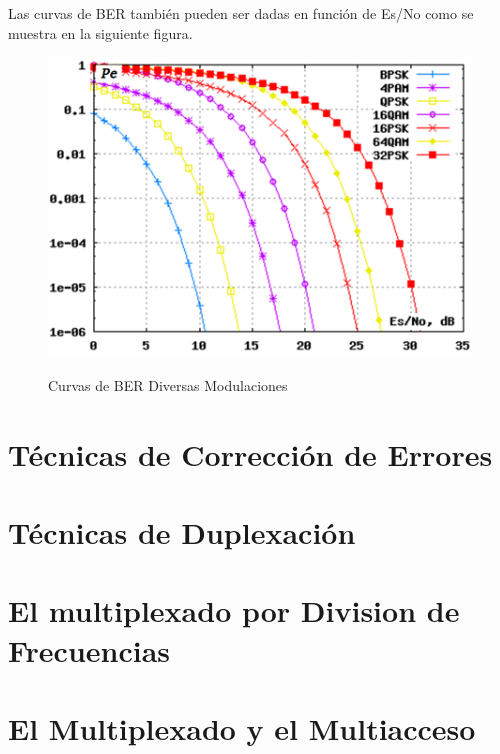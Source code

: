 Las curvas de BER también pueden ser dadas en función de Es/No como se muestra en la siguiente figura.

\begin{figure}[h!]
	\captionsetup{justification = raggedright, singlelinecheck = false}
	\caption{Curvas de BER Diversas Modulaciones} 
	\centering
	\includegraphics[scale=1]{Imagenes/Es.png}
	\label{fig:Es}
\end{figure}

\section{Técnicas de Corrección de Errores}


\section{Técnicas de Duplexación}


\section{El multiplexado por Division de Frecuencias}


\section{El Multiplexado y el Multiacceso}
